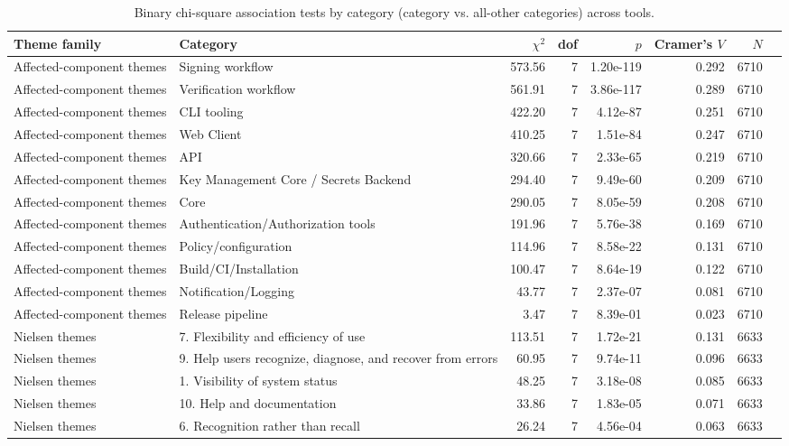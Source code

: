 \begin{table}[t]
\centering
\caption{Binary chi-square association tests by category (category vs. all-other categories) across tools.}
\label{tab:rq-binary-chi-all-categories}
\scriptsize
\begin{tabular}{llrrrrrr}
\hline
Theme family & Category & $\chi^2$ & dof & $p$ & Cramer's $V$ & $N$ \\
\hline
Affected-component themes & Signing workflow & 573.56 & 7 & 1.20e-119 & 0.292 & 6710 \\
Affected-component themes & Verification workflow & 561.91 & 7 & 3.86e-117 & 0.289 & 6710 \\
Affected-component themes & CLI tooling & 422.20 & 7 & 4.12e-87 & 0.251 & 6710 \\
Affected-component themes & Web Client & 410.25 & 7 & 1.51e-84 & 0.247 & 6710 \\
Affected-component themes & API & 320.66 & 7 & 2.33e-65 & 0.219 & 6710 \\
Affected-component themes & Key Management Core / Secrets Backend & 294.40 & 7 & 9.49e-60 & 0.209 & 6710 \\
Affected-component themes & Core & 290.05 & 7 & 8.05e-59 & 0.208 & 6710 \\
Affected-component themes & Authentication/Authorization tools & 191.96 & 7 & 5.76e-38 & 0.169 & 6710 \\
Affected-component themes & Policy/configuration & 114.96 & 7 & 8.58e-22 & 0.131 & 6710 \\
Affected-component themes & Build/CI/Installation & 100.47 & 7 & 8.64e-19 & 0.122 & 6710 \\
Affected-component themes & Notification/Logging & 43.77 & 7 & 2.37e-07 & 0.081 & 6710 \\
Affected-component themes & Release pipeline & 3.47 & 7 & 8.39e-01 & 0.023 & 6710 \\
Nielsen themes & 7. Flexibility and efficiency of use & 113.51 & 7 & 1.72e-21 & 0.131 & 6633 \\
Nielsen themes & 9. Help users recognize, diagnose, and recover from errors & 60.95 & 7 & 9.74e-11 & 0.096 & 6633 \\
Nielsen themes & 1. Visibility of system status & 48.25 & 7 & 3.18e-08 & 0.085 & 6633 \\
Nielsen themes & 10. Help and documentation & 33.86 & 7 & 1.83e-05 & 0.071 & 6633 \\
Nielsen themes & 6. Recognition rather than recall & 26.24 & 7 & 4.56e-04 & 0.063 & 6633 \\

\end{tabular}
\end{table}
